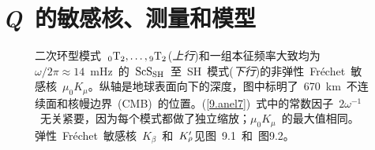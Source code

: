 \section{\textit{Q}~的敏感核、测量和模型}
%
%
%

\begin{figure}[!b]
\begin{center}
\end{center}
\caption[Qkernels1]{\label{9.fig.Qkern1}
二次环型模式~${}_0{\rm T}_2, \ldots,{}_9{\rm T}_2$({\em 上行\/})和一组本征频率大致均为~$\omega/2\pi\approx 14$~mHz~的~${\rm ScS}_{\rm SH}$~至~SH~模式({\em 下行\/})的非弹性~Fr\'{e}chet~敏感核~$\mu_0K_{\mu}$。纵轴是地球表面向下的深度，图中标明了~670~km~不连续面和核幔边界~(CMB)~的位置。(\ref{9.anel7})~式中的常数因子~$2\omega^{-1}$~无关紧要，因为每个模式都做了独立缩放；$\mu_0K_{\mu}$~的最大值相同。弹性~Fr\'{e}chet~敏感核~$K_{\beta}$~和~$K_{\raisebox{0.3 ex}{\scriptsize$\rho$}}^{\prime}$见图~9.1~和~图9.2。
}
\end{figure}

